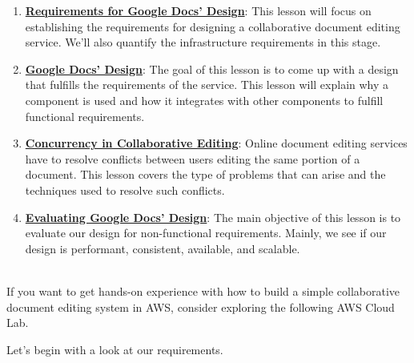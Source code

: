 \begin{enumerate}
\item
\protect{}\label{zuOBDl2YWx--66Q82GDiS}
\href{https://www.educative.io/courses/grokking-the-system-design-interview/requirements-of-google-docs-design}{\textbf{Requirements for Google Docs' Design}}: This lesson will focus on establishing the requirements for designing a collaborative document editing service. We'll also quantify the infrastructure requirements in this stage.
\item
\protect{}\label{wswurLJPJRgrdlr3ok7eq}
\href{https://www.educative.io/courses/grokking-the-system-design-interview/design-of-google-docs}{\textbf{Google Docs' Design}}: The goal of this lesson is to come up with a design that fulfills the requirements of the service. This lesson will explain why a component is used and how it integrates with other components to fulfill functional requirements.
\item
\protect{}\label{OmKSrU4R7uKdDf3vm3zTq}
\href{https://www.educative.io/courses/grokking-the-system-design-interview/concurrency-in-collaborative-editing}{\textbf{Concurrency in Collaborative Editing}}: Online document editing services have to resolve conflicts between users editing the same portion of a document. This lesson covers the type of problems that can arise and the techniques used to resolve such conflicts.
\item
\protect{}\label{wENc6TE5Uh9bOfZY0smf2}
\href{https://www.educative.io/courses/grokking-the-system-design-interview/evaluation-of-google-docs-design}{\textbf{Evaluating Google Docs' Design}}: The main objective of this lesson is to evaluate our design for non-functional requirements. Mainly, we see if our design is performant, consistent, available, and scalable.
\end{enumerate}
\\
If you want to get hands-on experience with how to build a simple collaborative document editing system in AWS, consider exploring the following AWS Cloud Lab.

Let's begin with a look at our requirements.

